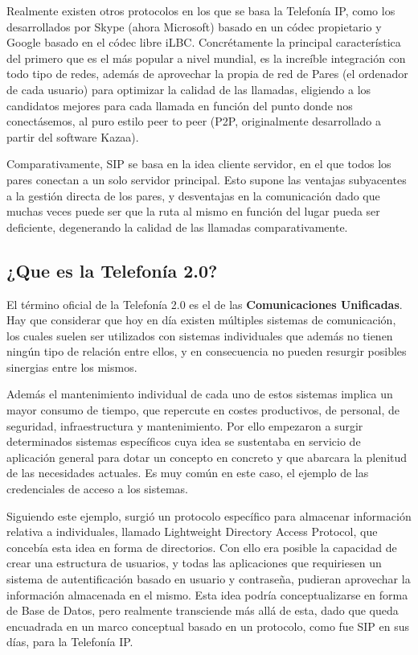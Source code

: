Realmente existen otros protocolos en los que se basa la Telefonía IP, como los desarrollados por Skype (ahora Microsoft) basado en un códec propietario y Google basado en el códec libre iLBC. Concrétamente la principal característica del primero que es el más popular a nivel mundial, es la increíble integración con todo tipo de redes, además de aprovechar la propia de red de Pares (el ordenador de cada usuario) para optimizar la calidad de las llamadas, eligiendo a los candidatos mejores para cada llamada en función del punto donde nos conectásemos, al puro estilo peer to peer (P2P, originalmente desarrollado a partir del software Kazaa). 

Comparativamente, SIP se basa en la idea cliente servidor, en el que todos los pares conectan a un solo servidor principal. Esto supone las ventajas subyacentes a la gestión directa de los pares, y desventajas en la comunicación dado que muchas veces puede ser que la ruta al mismo en función del lugar pueda ser deficiente, degenerando la calidad de las llamadas comparativamente.

\subsection{¿Que es la Telefonía 2.0?}

El término oficial de la Telefonía 2.0 es el de las \textbf{Comunicaciones Unificadas}. Hay que considerar que hoy en día existen múltiples sistemas de comunicación, los cuales suelen ser utilizados con sistemas individuales que además no tienen ningún tipo de relación entre ellos, y en consecuencia no pueden resurgir posibles sinergias entre los mismos.

Además el mantenimiento individual de cada uno de estos sistemas implica un mayor consumo de tiempo, que repercute en costes productivos, de personal, de seguridad, infraestructura y mantenimiento. Por ello empezaron a surgir determinados sistemas específicos cuya idea se sustentaba en servicio de aplicación general para dotar un concepto en concreto y que abarcara la plenitud de las necesidades actuales. Es muy común en este caso, el ejemplo de las credenciales de acceso a los sistemas.

Siguiendo este ejemplo, surgió un protocolo específico para almacenar información relativa a individuales, llamado Lightweight Directory Access Protocol, que concebía esta idea en forma de directorios. Con ello era posible la capacidad de crear una estructura de usuarios, y todas las aplicaciones que requiriesen un sistema de autentificación basado en usuario y contraseña, pudieran aprovechar la información almacenada en el mismo. Esta idea podría conceptualizarse en forma de Base de Datos, pero realmente transciende más allá de esta, dado que queda encuadrada en un marco conceptual basado en un protocolo, como fue SIP en sus días, para la Telefonía IP.

